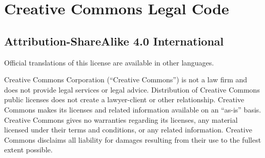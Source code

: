 


\section*{Creative Commons Legal Code}

\subsection{Attribution-ShareAlike 4.0 International}

Official translations of this license are available in other languages.

\par Creative Commons Corporation (``Creative Commons'') is not a law firm and does not provide legal services or legal advice. 
Distribution of Creative Commons public licenses does not create a lawyer-client or other relationship. Creative Commons makes 
its licenses and related information available on an “as-is” basis. Creative Commons gives no warranties regarding its licenses, 
any material licensed under their terms and conditions, or any related information. Creative Commons disclaims all liability for 
damages resulting from their use to the fullest extent possible.


